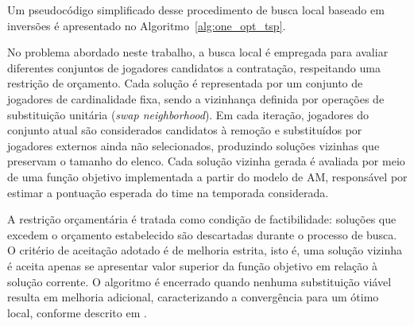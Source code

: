 Um pseudocódigo simplificado desse procedimento de busca local baseado em inversões é apresentado no 
Algoritmo~\ref{alg:one_opt_tsp}.



No problema abordado neste trabalho, a busca local é empregada para avaliar diferentes conjuntos de jogadores candidatos a contratação, respeitando 
uma restrição de orçamento. Cada solução é representada por um conjunto de jogadores de cardinalidade fixa, sendo a vizinhança definida por operações de 
substituição unitária (\textit{swap neighborhood}). Em cada iteração, jogadores do conjunto atual são considerados candidatos à remoção e substituídos 
por jogadores externos ainda não selecionados, produzindo soluções vizinhas que preservam o tamanho do elenco. Cada solução vizinha gerada é avaliada por 
meio de uma função objetivo implementada a partir do modelo de AM, responsável por estimar a pontuação esperada do time na temporada considerada.

A restrição orçamentária é tratada como condição de factibilidade: soluções que excedem o orçamento estabelecido são descartadas durante o processo de busca. 
O critério de aceitação adotado é de melhoria estrita, isto é, uma solução vizinha é aceita apenas se apresentar valor superior da função objetivo em relação 
à solução corrente. O algoritmo é encerrado quando nenhuma substituição viável resulta em melhoria adicional, caracterizando a convergência para um ótimo local, 
conforme descrito em \cite{Gendreau2010}.